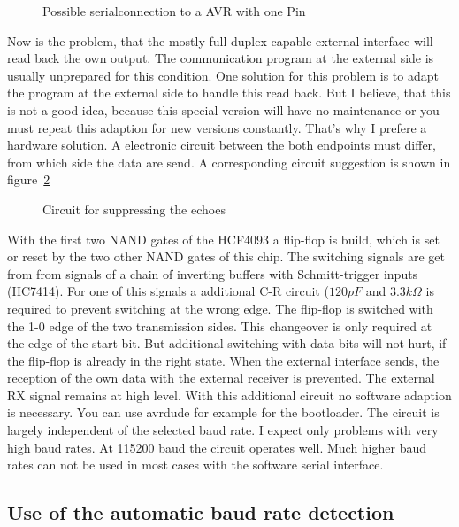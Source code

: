 \begin{figure}[H]
\centering
{}
\caption{Possible serialconnection to a AVR with one Pin}
\label{fig:onewire-simple}
\end{figure}

Now is the problem, that the mostly full-duplex capable external interface will
read back the own output.
The communication program at the external side is usually unprepared for this condition.
One solution for this problem is to adapt the program at the external side to handle
this read back.
But I believe, that this is not a good idea, because this special version will 
have no maintenance or you must repeat this adaption for new versions constantly.
That's why I prefere a hardware solution.
A electronic circuit between the both endpoints must differ, from which side
the data are send.
A corresponding circuit suggestion is shown in figure~\ref{fig:onewire}

\begin{figure}[H]
\centering
{}
\caption{Circuit for suppressing the echoes}
\label{fig:onewire}
\end{figure}

With the first two NAND gates of the HCF4093 a flip-flop is build,
which is set or reset by the two other NAND gates of this chip.
The switching signals are get from from signals of a chain of inverting buffers
with Schmitt-trigger inputs (HC7414).
For one of this signals a additional C-R circuit (\(120 pF\) and \(3.3 k\Omega\) is
required to prevent switching at the wrong edge.
The flip-flop is switched with the 1-0 edge of the two transmission sides.
This changeover is only required at the edge of the start bit.
But additional switching with data bits will not hurt, if the flip-flop
is already in the right state.
When the external interface sends, the reception of the own data with the
external receiver is prevented. The external RX signal remains at high level.
With this additional circuit no software adaption is necessary.
You can use avrdude for example for the bootloader.
The circuit is largely independent of the selected baud rate.
I expect only problems with very high baud rates.
At 115200 baud the circuit operates well. Much higher baud rates can 
not be used in most cases with the software serial interface.

\subsection{Use of the automatic baud rate detection}


